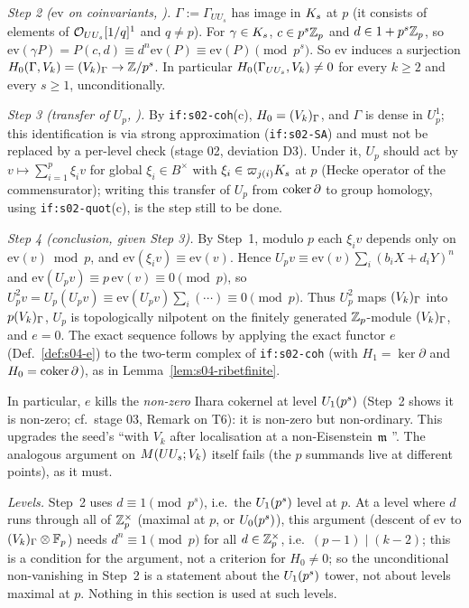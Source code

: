 \emph{Step 2 ($\mathrm{ev}$ on coinvariants, \stproved).} $\Gamma:=\Gamma_{UU_s}$ has image in $K_{s}$ at $p$ (it consists of elements of
$\mathcal{O}_{UU_s}[1/q]^1$ and $q\ne p$). For $\gamma\in K_{s}$, $c\in p^s\mathbb{Z}_p$ and $d\in1+p^s\mathbb{Z}_p$, so $\mathrm{ev}(\gamma P)=P(c,d)\equiv
d^n\mathrm{ev}(P)\equiv\mathrm{ev}(P)\pmod{p^s}$. So $\mathrm{ev}$ induces a surjection $H_0(\Gamma,V_k)=(V_k)_\Gamma\to\mathbb{Z}/p^s$. In
particular $H_0(\Gamma_{UU_s},V_k)\ne0$ for every $k\ge2$ and every $s\ge1$, unconditionally.

\emph{Step 3 (transfer of $U_p$, \sttoprove).} By \texttt{if:s02-coh}(c), $H_0=(V_k)_\Gamma$, and $\Gamma$ is dense in $U^1_p$; this
identification is \stpmc{} via strong approximation (\texttt{if:s02-SA}) and must not be replaced by a per-level check (stage 02,
deviation D3). Under it, $U_p$ should act by $v\mapsto\sum_{i=1}^{p}\xi_iv$ for global $\xi_i\in B^\times$ with
$\xi_i\in\varpi_{j(i)}K_{s}$ at $p$ (Hecke operator of the commensurator); writing this transfer of $U_p$ from $\operatorname{coker}\partial$ to group
homology, using \texttt{if:s02-quot}(c), is the step still to be done.

\emph{Step 4 (conclusion, \stproved{} given Step 3).} By Step~1, modulo $p$ each $\xi_iv$ depends only on $\mathrm{ev}(v)\bmod p$, and
$\mathrm{ev}(\xi_iv)\equiv\mathrm{ev}(v)$. Hence $U_pv\equiv\mathrm{ev}(v)\sum_i(b_iX+d_iY)^n$ and $\mathrm{ev}(U_pv)\equiv p\,\mathrm{ev}(v)\equiv0
\pmod p$, so $U_p^2v=U_p(U_pv)\equiv\mathrm{ev}(U_pv)\sum_i(\cdots)\equiv0\pmod p$. Thus $U_p^2$ maps $(V_k)_\Gamma$ into
$p(V_k)_\Gamma$, $U_p$ is topologically nilpotent on the finitely generated $\mathbb{Z}_p$-module $(V_k)_\Gamma$, and $e=0$. The exact sequence
follows by applying the exact functor $e$ (Def.~\ref{def:s04-e}) to the two-term complex of \texttt{if:s02-coh} (with
$H_1=\ker\partial$ and $H_0=\operatorname{coker}\partial$), as in Lemma~\ref{lem:s04-ribetfinite}.

\noindent In particular, $e$ kills the \emph{non-zero} Ihara cokernel at level $U_1(p^s)$ (Step~2 shows it is non-zero; cf.\ stage 03,
Remark on T6): it is non-zero but non-ordinary. This upgrades the seed's ``with $V_k$ after localisation at a non-Eisenstein $\mathfrak{m}$
\stsketch''. The analogous argument on $M(UU_s;V_k)$ itself fails (the $p$ summands live at different points), as it must.

\noindent\emph{Levels.} Step~2 uses $d\equiv1\pmod{p^s}$, i.e.\ the $U_1(p^s)$ level at $p$. At a level where $d$ runs through all of
$\mathbb{Z}_p^\times$ (maximal at $p$, or $U_0(p^s)$), this argument (descent of $\mathrm{ev}$ to $(V_k)_\Gamma\otimes\mathbb{F}_p$) needs
$d^n\equiv1\pmod p$ for all $d\in\mathbb{Z}_p^\times$, i.e.\ $(p-1)\mid(k-2)$; this is a condition for the argument, not a criterion for
$H_0\ne0$; so the unconditional non-vanishing in Step~2 is a statement about the $U_1(p^s)$
tower, not about levels maximal at $p$. Nothing in this section is used at such levels.

